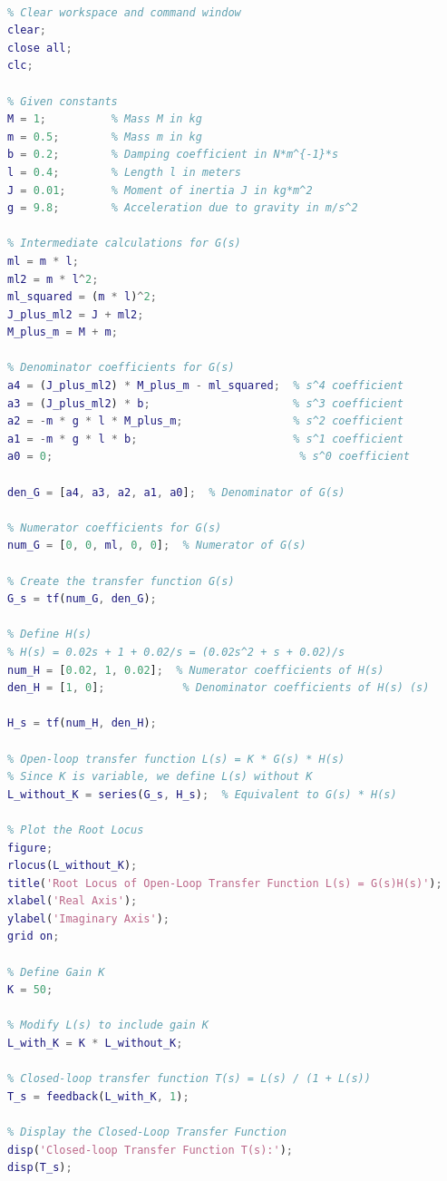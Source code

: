 \documentclass[12pt]{article}
\begin{document}
\begin{lstlisting}[language=Matlab, caption={MATLAB Code for Root Locus and Closed-Loop Poles}]
% MATLAB code to plot the root locus and find closed-loop poles at K = 50

% Clear workspace and command window
clear;
close all;
clc;

% Given constants
M = 1;          % Mass M in kg
m = 0.5;        % Mass m in kg
b = 0.2;        % Damping coefficient in N*m^{-1}*s
l = 0.4;        % Length l in meters
J = 0.01;       % Moment of inertia J in kg*m^2
g = 9.8;        % Acceleration due to gravity in m/s^2

% Intermediate calculations for G(s)
ml = m * l;
ml2 = m * l^2;
ml_squared = (m * l)^2;
J_plus_ml2 = J + ml2;
M_plus_m = M + m;

% Denominator coefficients for G(s)
a4 = (J_plus_ml2) * M_plus_m - ml_squared;  % s^4 coefficient
a3 = (J_plus_ml2) * b;                      % s^3 coefficient
a2 = -m * g * l * M_plus_m;                 % s^2 coefficient
a1 = -m * g * l * b;                        % s^1 coefficient
a0 = 0;                                      % s^0 coefficient

den_G = [a4, a3, a2, a1, a0];  % Denominator of G(s)

% Numerator coefficients for G(s)
num_G = [0, 0, ml, 0, 0];  % Numerator of G(s)

% Create the transfer function G(s)
G_s = tf(num_G, den_G);

% Define H(s)
% H(s) = 0.02s + 1 + 0.02/s = (0.02s^2 + s + 0.02)/s
num_H = [0.02, 1, 0.02];  % Numerator coefficients of H(s)
den_H = [1, 0];            % Denominator coefficients of H(s) (s)

H_s = tf(num_H, den_H);

% Open-loop transfer function L(s) = K * G(s) * H(s)
% Since K is variable, we define L(s) without K
L_without_K = series(G_s, H_s);  % Equivalent to G(s) * H(s)

% Plot the Root Locus
figure;
rlocus(L_without_K);
title('Root Locus of Open-Loop Transfer Function L(s) = G(s)H(s)');
xlabel('Real Axis');
ylabel('Imaginary Axis');
grid on;

% Define Gain K
K = 50;

% Modify L(s) to include gain K
L_with_K = K * L_without_K;

% Closed-loop transfer function T(s) = L(s) / (1 + L(s))
T_s = feedback(L_with_K, 1);

% Display the Closed-Loop Transfer Function
disp('Closed-loop Transfer Function T(s):');
disp(T_s);


\end{lstlisting}
\end{document}
